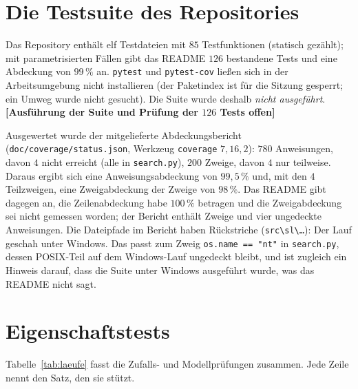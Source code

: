 \documentclass[a4paper,12pt,twoside]{report}
\DeclareRobustCommand{\_}{\ifmmode\mbox{\textunderscore}\else\textunderscore\allowbreak{}\fi}
\theoremstyle{definition}
\newcommand{\offen}[1]{\textcolor{accentred}{\textbf{[#1]}}}
\begin{document}
\section{Die Testsuite des Repositories}
\label{sec:suite}

Das Repository enthält elf Testdateien mit $85$ Testfunktionen (statisch gezählt); mit parametrisierten Fällen gibt das README $126$ bestandene Tests und eine Abdeckung von $99\,\%$ an. \texttt{pytest} und \texttt{pytest-cov} ließen sich in der Arbeitsumgebung nicht installieren (der Paketindex ist für die Sitzung gesperrt; ein Umweg wurde nicht gesucht). Die Suite wurde deshalb \emph{nicht ausgeführt}. \offen{Ausführung der Suite und Prüfung der $126$ Tests offen}

Ausgewertet wurde der mitgelieferte Abdeckungsbericht (\texttt{doc/coverage/status.json}, Werkzeug \texttt{coverage} $7{,}16{,}2$): $780$ Anweisungen, davon $4$ nicht erreicht (alle in \texttt{search.py}), $200$ Zweige, davon $4$ nur teilweise. Daraus ergibt sich eine Anweisungsabdeckung von $99{,}5\,\%$ und, mit den $4$ Teilzweigen, eine Zweigabdeckung der Zweige von $98\,\%$. Das README gibt dagegen an, die Zeilenabdeckung habe $100\,\%$ betragen und die Zweigabdeckung sei nicht gemessen worden; der Bericht enthält Zweige und vier ungedeckte Anweisungen. Die Dateipfade im Bericht haben Rückstriche (\texttt{src\textbackslash sl\textbackslash\ldots}): Der Lauf geschah unter Windows. Das passt zum Zweig \texttt{os.name == "nt"} in \texttt{search.py}, dessen POSIX-Teil auf dem Windows-Lauf ungedeckt bleibt, und ist zugleich ein Hinweis darauf, dass die Suite unter Windows ausgeführt wurde, was das README nicht sagt.

\section{Eigenschaftstests}
\label{sec:messung}

Tabelle~\ref{tab:laeufe} fasst die Zufalls- und Modellprüfungen zusammen. Jede Zeile nennt den Satz, den sie stützt.
\end{document}
